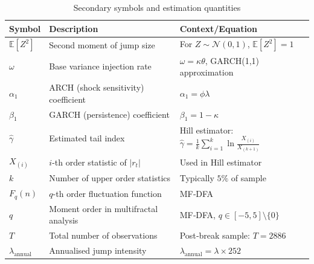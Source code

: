 \begin{table}[H]
\centering
\begin{tabular}{p{2.5cm} p{8cm} p{4cm}}
\hline
\textbf{Symbol} & \textbf{Description} & \textbf{Context/Equation} \\
\hline
$\mathbb{E}[Z^2]$ & Second moment of jump size & For $Z\sim\mathcal{N}(0,1)$, $\mathbb{E}[Z^2]=1$ \\
$\omega$ & Base variance injection rate & $\omega = \kappa\theta$, GARCH(1,1) approximation \\
$\alpha_1$ & ARCH (shock sensitivity) coefficient & $\alpha_1 = \phi\lambda$ \\
$\beta_1$ & GARCH (persistence) coefficient & $\beta_1 = 1 - \kappa$ \\
$\hat{\gamma}$ & Estimated tail index & Hill estimator: $\hat{\gamma} = \frac{1}{k}\sum_{i=1}^{k}\ln\frac{X_{(i)}}{X_{(k+1)}}$ \\
$X_{(i)}$ & $i$-th order statistic of $|r_t|$ & Used in Hill estimator \\
$k$ & Number of upper order statistics & Typically $5\%$ of sample \\
$F_q(n)$ & $q$-th order fluctuation function & MF‑DFA \\
$q$ & Moment order in multifractal analysis & MF‑DFA, $q\in[-5,5]\setminus\{0\}$ \\
$T$ & Total number of observations & Post‑break sample: $T=2886$ \\
$\lambda_{\text{annual}}$ & Annualised jump intensity & $\lambda_{\text{annual}} = \lambda \times 252$ \\
\hline
\end{tabular}
\caption{Secondary symbols and estimation quantities}
\label{tab:symbols2}
\end{table}

